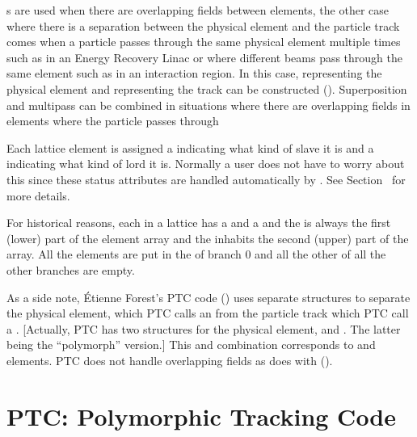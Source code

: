 s are used when there are overlapping fields between
elements, the other case where there is a separation between the
physical element and the particle track comes when a particle passes
through the same physical element multiple times such as in an Energy
Recovery Linac or where different beams pass through the same element
such as in an interaction region. In this case, 
representing the physical element and 
representing the track can be constructed ().
Superposition and multipass can be combined in situations where there
are overlapping fields in elements where the particle passes through

Each lattice element is assigned a  indicating what kind of slave it is
and a  indicating what kind of lord it is. Normally a user does not
have to worry about this since these status attributes are handled automatically by \bmad.
See Section~ for more details.

For historical reasons, each  in a lattice has a
 and a  and the  is always the first (lower) part of the element array and the
 inhabits the second (upper) part of the array.  All
the  elements are put in the  of branch 0
and all the other  of all the other branches are
empty.

As a side note, \'Etienne Forest's PTC code () uses separate
structures to separate the physical element, which PTC calls an
 from the particle track which PTC call a .
[Actually, PTC has two structures for the physical element,
 and . The latter being the ``polymorph''
version.] This  and  combination corresponds to
\bmad {} and  elements. PTC does
not handle overlapping fields as \bmad does with 
().

\section{PTC: Polymorphic Tracking Code}
\label{s:ptc.intro}


